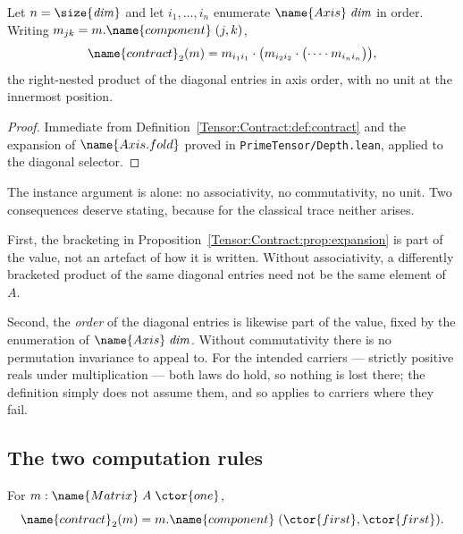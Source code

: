 \begin{proposition}\label{Tensor:Contract:prop:expansion}
Let $n = \size{\mathit{dim}}$ and let $i_1, \dots, i_n$ enumerate
$\name{Axis}\;\mathit{dim}$ in order.  Writing
$m_{jk} = m.\name{component}\;(j,k)$,
\[
  \name{contract}_2(m)
    = m_{i_1 i_1} \cdot
      \bigl( m_{i_2 i_2} \cdot
        \bigl( \cdots \cdot m_{i_n i_n} \bigr) \bigr),
\]
the right-nested product of the diagonal entries in axis order, with no unit
at the innermost position.
\end{proposition}

\begin{proof}
Immediate from Definition~\ref{Tensor:Contract:def:contract} and the expansion
of $\name{Axis.fold}$ proved in \texttt{PrimeTensor/Depth.lean}, applied to
the diagonal selector.
\end{proof}

\begin{designnote}
\label{Tensor:Contract:note:magma}
The instance argument is \lean{[Mul A]} alone: no associativity, no
commutativity, no unit.  Two consequences deserve stating, because for the
classical trace neither arises.

First, the bracketing in
Proposition~\ref{Tensor:Contract:prop:expansion} is part of the value, not an
artefact of how it is written.  Without associativity, a differently bracketed
product of the same diagonal entries need not be the same element of $A$.

Second, the \emph{order} of the diagonal entries is likewise part of the
value, fixed by the enumeration of $\name{Axis}\;\mathit{dim}$.  Without
commutativity there is no permutation invariance to appeal to.  For the
intended carriers --- strictly positive reals under multiplication --- both
laws do hold, so nothing is lost there; the definition simply does not assume
them, and so applies to carriers where they fail.
\end{designnote}

\subsection{The two computation rules}

\begin{lemma}
\label{Tensor:Contract:lem:one}
For $m : \name{Matrix}\;A\;\ctor{one}$,
\[
  \name{contract}_2(m) = m.\name{component}\;(\ctor{first}, \ctor{first}).
\]
\end{lemma}

